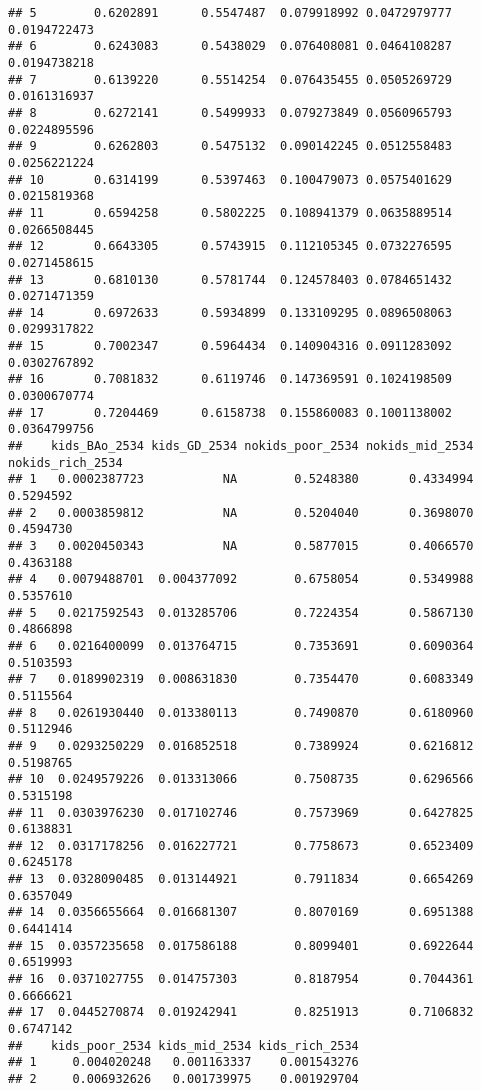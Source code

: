 \documentclass[
]{article}
\begin{document}
\begin{verbatim}
## 5        0.6202891      0.5547487  0.079918992 0.0472979777  0.0194722473
## 6        0.6243083      0.5438029  0.076408081 0.0464108287  0.0194738218
## 7        0.6139220      0.5514254  0.076435455 0.0505269729  0.0161316937
## 8        0.6272141      0.5499933  0.079273849 0.0560965793  0.0224895596
## 9        0.6262803      0.5475132  0.090142245 0.0512558483  0.0256221224
## 10       0.6314199      0.5397463  0.100479073 0.0575401629  0.0215819368
## 11       0.6594258      0.5802225  0.108941379 0.0635889514  0.0266508445
## 12       0.6643305      0.5743915  0.112105345 0.0732276595  0.0271458615
## 13       0.6810130      0.5781744  0.124578403 0.0784651432  0.0271471359
## 14       0.6972633      0.5934899  0.133109295 0.0896508063  0.0299317822
## 15       0.7002347      0.5964434  0.140904316 0.0911283092  0.0302767892
## 16       0.7081832      0.6119746  0.147369591 0.1024198509  0.0300670774
## 17       0.7204469      0.6158738  0.155860083 0.1001138002  0.0364799756
##    kids_BAo_2534 kids_GD_2534 nokids_poor_2534 nokids_mid_2534 nokids_rich_2534
## 1   0.0002387723           NA        0.5248380       0.4334994        0.5294592
## 2   0.0003859812           NA        0.5204040       0.3698070        0.4594730
## 3   0.0020450343           NA        0.5877015       0.4066570        0.4363188
## 4   0.0079488701  0.004377092        0.6758054       0.5349988        0.5357610
## 5   0.0217592543  0.013285706        0.7224354       0.5867130        0.4866898
## 6   0.0216400099  0.013764715        0.7353691       0.6090364        0.5103593
## 7   0.0189902319  0.008631830        0.7354470       0.6083349        0.5115564
## 8   0.0261930440  0.013380113        0.7490870       0.6180960        0.5112946
## 9   0.0293250229  0.016852518        0.7389924       0.6216812        0.5198765
## 10  0.0249579226  0.013313066        0.7508735       0.6296566        0.5315198
## 11  0.0303976230  0.017102746        0.7573969       0.6427825        0.6138831
## 12  0.0317178256  0.016227721        0.7758673       0.6523409        0.6245178
## 13  0.0328090485  0.013144921        0.7911834       0.6654269        0.6357049
## 14  0.0356655664  0.016681307        0.8070169       0.6951388        0.6441414
## 15  0.0357235658  0.017586188        0.8099401       0.6922644        0.6519993
## 16  0.0371027755  0.014757303        0.8187954       0.7044361        0.6666621
## 17  0.0445270874  0.019242941        0.8251913       0.7106832        0.6747142
##    kids_poor_2534 kids_mid_2534 kids_rich_2534
## 1     0.004020248   0.001163337    0.001543276
## 2     0.006932626   0.001739975    0.001929704

\end{verbatim}
\end{document}
